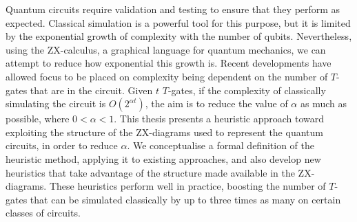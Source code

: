 Quantum circuits require validation and testing to ensure that they perform as expected. 
Classical simulation is a powerful tool for this purpose, but it is limited by the exponential growth of complexity with the number of qubits.
Nevertheless, using the ZX-calculus, a graphical language for quantum mechanics,
we can attempt to reduce how exponential this growth is.
Recent developments have allowed focus to be placed on complexity being dependent on the number of $T$-gates that are in the circuit.
Given $t$ $T$-gates, if the complexity of classically simulating the circuit is $O(2^{\alpha t})$,
the aim is to reduce the value of $\alpha$ as much as possible, where $0<\alpha<1$.
This thesis presents a heuristic approach toward exploiting the structure of the
ZX-diagrams used to represent the quantum circuits, in order to reduce $\alpha$.
We conceptualise a formal definition of the heuristic method, applying it to existing approaches,
and also develop new heuristics that take advantage of the structure made available in the ZX-diagrams.
These heuristics perform well in practice, 
boosting the number of $T$-gates that can be simulated classically by up to three times as many
on certain classes of circuits.
